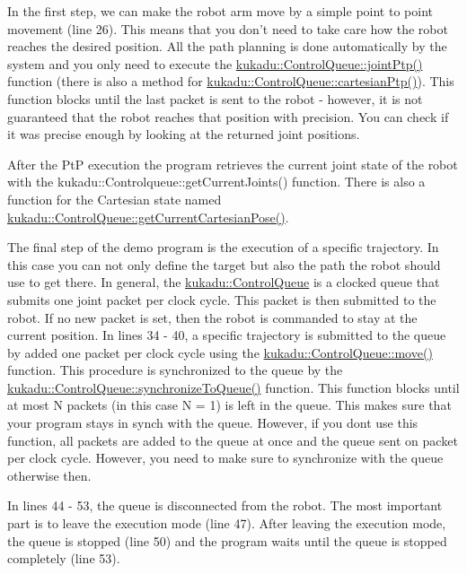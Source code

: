 In the first step, we can make the robot arm move by a simple point to point movement (line 26). This means that you don't need to take care how the robot reaches the desired position. All the path planning is done automatically by the system and you only need to execute the \hyperlink{classkukadu_1_1ControlQueue_ad11059100321b24a1af8ef7de8314353}{kukadu\-::\-Control\-Queue\-::joint\-Ptp()} function (there is also a method for \hyperlink{classkukadu_1_1ControlQueue_a1bfa23a8ce6319f6ef0ed9208e896054}{kukadu\-::\-Control\-Queue\-::cartesian\-Ptp()}). This function blocks until the last packet is sent to the robot -\/ however, it is not guaranteed that the robot reaches that position with precision. You can check if it was precise enough by looking at the returned joint positions.

After the Pt\-P execution the program retrieves the current joint state of the robot with the kukadu\-::\-Controlqueue\-::get\-Current\-Joints() function. There is also a function for the Cartesian state named \hyperlink{classkukadu_1_1ControlQueue_a9e79e1d0d9697bbf146d66a2d01fea9e}{kukadu\-::\-Control\-Queue\-::get\-Current\-Cartesian\-Pose()}.

The final step of the demo program is the execution of a specific trajectory. In this case you can not only define the target but also the path the robot should use to get there. In general, the \hyperlink{classkukadu_1_1ControlQueue}{kukadu\-::\-Control\-Queue} is a clocked queue that submits one joint packet per clock cycle. This packet is then submitted to the robot. If no new packet is set, then the robot is commanded to stay at the current position. In lines 34 -\/ 40, a specific trajectory is submitted to the queue by added one packet per clock cycle using the \hyperlink{classkukadu_1_1ControlQueue_aca70a978b2950d7c9ab99d55c5977eec}{kukadu\-::\-Control\-Queue\-::move()} function. This procedure is synchronized to the queue by the \hyperlink{classkukadu_1_1ControlQueue_a324484e79a5505656a32d9f32054e5d0}{kukadu\-::\-Control\-Queue\-::synchronize\-To\-Queue()} function. This function blocks until at most N packets (in this case N = 1) is left in the queue. This makes sure that your program stays in synch with the queue. However, if you dont use this function, all packets are added to the queue at once and the queue sent on packet per clock cycle. However, you need to make sure to synchronize with the queue otherwise then.

In lines 44 -\/ 53, the queue is disconnected from the robot. The most important part is to leave the execution mode (line 47). After leaving the execution mode, the queue is stopped (line 50) and the program waits until the queue is stopped completely (line 53).

